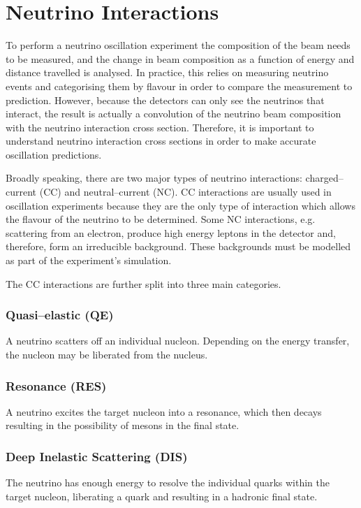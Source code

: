 \section{Neutrino Interactions} \label{nu_prod}

To perform a neutrino oscillation experiment the composition of the beam needs
to be measured, and the change in beam composition as a function of energy and
distance travelled is analysed. In practice, this relies on measuring
neutrino events and categorising them by flavour in order to compare the
measurement to prediction. However, because the detectors can only see the 
neutrinos that interact, the result is actually a convolution of the neutrino 
beam composition with the neutrino interaction cross section. Therefore, it is 
important to understand neutrino interaction cross sections in order to make 
accurate oscillation predictions.

Broadly speaking, there are two major types of neutrino interactions:
charged--current (CC) and neutral--current (NC). CC interactions are usually 
used in oscillation experiments because they are the only type of interaction 
which allows the flavour of the neutrino to be determined. Some 
NC interactions, e.g. scattering from an electron, produce high energy leptons 
in the detector and, therefore, form an irreducible background. These 
backgrounds must be modelled as part of the experiment's simulation.

\bigskip\noindent
The CC interactions are further split into three main categories.
\subsubsection*{Quasi--elastic (QE)}
A neutrino scatters off an individual nucleon. Depending on the energy 
transfer, the nucleon may be liberated from the nucleus.
\subsubsection*{Resonance (RES)}
A neutrino excites the target nucleon into a resonance, which then decays
resulting in the possibility of mesons in the final state.
\subsubsection*{Deep Inelastic Scattering (DIS)}
The neutrino has enough energy to resolve the individual quarks within the
target nucleon, liberating a quark and resulting in a hadronic final state.

